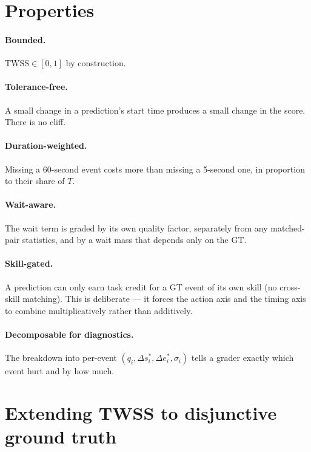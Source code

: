 \documentclass[11pt]{article}
\newcommand{\TWSS}{\mathrm{TWSS}}
\newcommand{\Tt}{T}
\newcommand{\qi}{q_i}
\begin{document}
\section{Properties}
\label{sec:properties}

\paragraph{Bounded.} $\TWSS \in [0, 1]$ by construction.

\paragraph{Tolerance-free.} A small change in a prediction's start
time produces a small change in the score. There is no cliff.

\paragraph{Duration-weighted.} Missing a 60-second event costs more
than missing a 5-second one, in proportion to their share of $\Tt$.

\paragraph{Wait-aware.} The wait term is graded by its own quality
factor, separately from any matched-pair statistics, and by a wait
mass that depends only on the GT.

\paragraph{Skill-gated.} A prediction can only earn task credit for a
GT event of its own skill (no cross-skill matching). This is
deliberate --- it forces the action axis and the timing axis to
combine multiplicatively rather than additively.

\paragraph{Decomposable for diagnostics.} The breakdown into per-event
$(\qi, \Delta s_i^*, \Delta e_i^*, \sigma_i)$ tells a grader exactly
which event hurt and by how much.

\section{Extending TWSS to disjunctive ground truth}
\label{sec:disjunctive}
\end{document}
